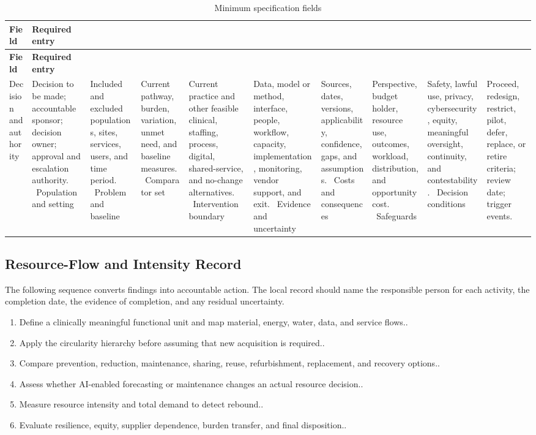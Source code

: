 \begin{longtable}{@{}p{}p{}@{}}
\caption{Minimum specification fields}
\label{tab:comp-ch13-spec-fields}\\
\toprule
\textbf{Field} & \textbf{Required entry} \\
\midrule
\endfirsthead
\toprule
\textbf{Field} & \textbf{Required entry} \\
\midrule
\endhead
\bottomrule
\endlastfoot
Decision and authority & Decision to be made; accountable sponsor; decision owner; approval and escalation authority. \
Population and setting & Included and excluded populations, sites, services, users, and time period. \
Problem and baseline & Current pathway, burden, variation, unmet need, and baseline measures. \
Comparator set & Current practice and other feasible clinical, staffing, process, digital, shared-service, and no-change alternatives. \
Intervention boundary & Data, model or method, interface, people, workflow, capacity, implementation, monitoring, vendor support, and exit. \
Evidence and uncertainty & Sources, dates, versions, applicability, confidence, gaps, and assumptions. \
Costs and consequences & Perspective, budget holder, resource use, outcomes, workload, distribution, and opportunity cost. \
Safeguards & Safety, lawful use, privacy, cybersecurity, equity, meaningful oversight, continuity, and contestability. \
Decision conditions & Proceed, redesign, restrict, pilot, defer, replace, or retire criteria; review date; trigger events. \
\end{longtable}

\subsection{Resource-Flow and Intensity Record}
\label{sec:comp-ch13-supp-2}
The following sequence converts findings into accountable action. The local record
should name the responsible person for each activity, the completion date, the
evidence of completion, and any residual uncertainty.

\begin{enumerate}
 \item Define a clinically meaningful functional unit and map material, energy, water, data, and service flows..
 \item Apply the circularity hierarchy before assuming that new acquisition is required..
 \item Compare prevention, reduction, maintenance, sharing, reuse, refurbishment, replacement, and recovery options..
 \item Assess whether AI-enabled forecasting or maintenance changes an actual resource decision..
 \item Measure resource intensity and total demand to detect rebound..
 \item Evaluate resilience, equity, supplier dependence, burden transfer, and final disposition..
\end{enumerate}

